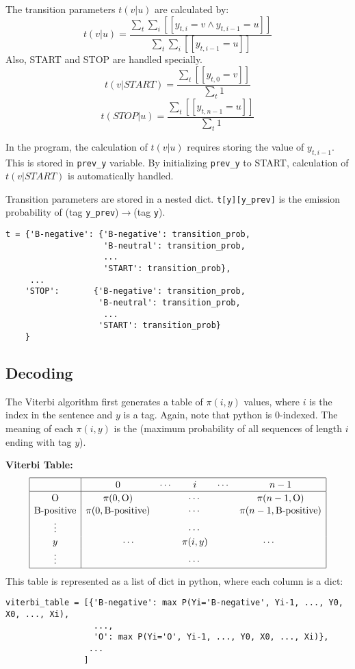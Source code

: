 \documentclass[12pt]{article}
\begin{document}
The transition parameters \(t(v|u)\) are calculated by:
\[ t(v|u) = \frac{\sum_t \sum_i [[y_{t,i}=v \land y_{t,i-1}=u]] }{\sum_{t} \sum_i [[y_{t,i-1}=u]] } \]
Also, START and STOP are handled specially.
\[ t(v|START) = \frac{\sum_t [[y_{t,0}=v]] }{\sum_{t} 1 } \]
\[ t(STOP|u) = \frac{\sum_t [[y_{t,n-1}=u]] }{\sum_{t} 1 } \]

In the program, the calculation of \(t(v|u)\) requires storing the value of \(y_{t,i-1}\). This is stored in \verb|prev_y| variable. By initializing \verb|prev_y| to START, calculation of \(t(v|START)\) is automatically handled.

Transition parameters are stored in a nested dict. \verb|t[y][y_prev]| is the emission probability of (tag \verb|y_prev|)\(\rightarrow\)(tag \verb|y|).

\begin{verbatim}
t = {'B-negative': {'B-negative': transition_prob,
                    'B-neutral': transition_prob,
                    ...
                    'START': transition_prob},
     ...
    'STOP':       {'B-negative': transition_prob,
                   'B-neutral': transition_prob,
                    ...
                   'START': transition_prob}
    }
\end{verbatim}

\subsection{Decoding}

The Viterbi algorithm first generates a table of \(\pi(i,y)\) values, where \(i\) is the index in the sentence and \(y\) is a tag. Again, note that python is 0-indexed. The meaning of each \(\pi(i,y)\) is the (maximum probability of all sequences of length \(i\) ending with tag \(y\)).

\textbf{Viterbi Table:}
\[
\begin{array}{|c|ccccc|}
\hline \rule{0pt}{1em}
& 0 & \cdots & i & \cdots & n-1 \\
\hline \rule{0pt}{1em}
\mbox{O}          & \pi(0,\mbox{O}) & \multicolumn{3}{c}{\cdots} & \pi(n-1,\mbox{O}) \\[0.1em]
\mbox{B-positive} & \pi(0,\mbox{B-positive}) & \multicolumn{3}{c}{\cdots} & \pi(n-1,\mbox{B-positive}) \\[0.1em]
\vdots &          & \multicolumn{3}{c}{\cdots} &            \\[0.1em]
y      & \multicolumn{2}{c}{\cdots} & \pi(i,y) & \multicolumn{2}{c|}{\cdots} \\[0.1em]
\vdots &          & \multicolumn{3}{c}{\cdots} &            \\[0.1em]
\hline
\end{array}
\]
This table is represented as a list of dict in python, where each column is a dict:
\begin{verbatim}
viterbi_table = [{'B-negative': max P(Yi='B-negative', Yi-1, ..., Y0, X0, ..., Xi),
                  ...,
                  'O': max P(Yi='O', Yi-1, ..., Y0, X0, ..., Xi)},
                 ...
                ]
\end{verbatim}
\end{document}
